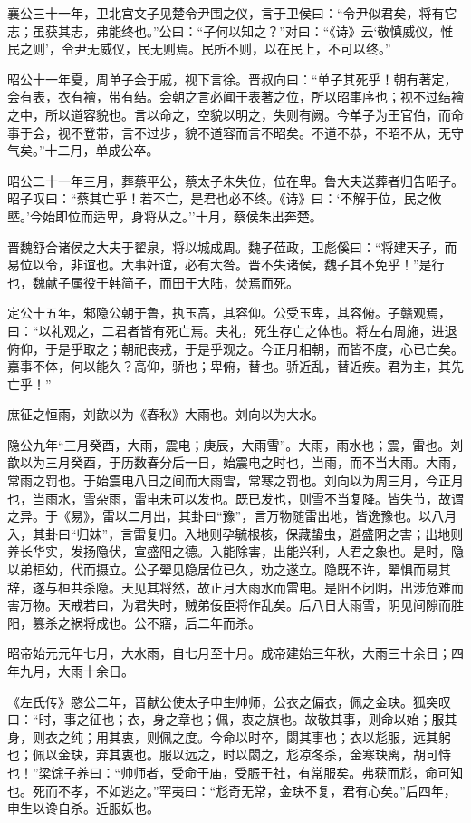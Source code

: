 \documentclass[]{article}
\begin{document}
襄公三十一年，卫北宫文子见楚令尹围之仪，言于卫侯曰：``令尹似君矣，将有它志；虽获其志，弗能终也。''公曰：``子何以知之？''对曰：``《诗》云`敬慎威仪，惟民之则'，令尹无威仪，民无则焉。民所不则，以在民上，不可以终。''

昭公十一年夏，周单子会于戚，视下言徐。晋叔向曰：``单子其死乎！朝有著定，会有表，衣有襘，带有结。会朝之言必闻于表著之位，所以昭事序也；视不过结襘之中，所以道容貌也。言以命之，空貌以明之，失则有阙。今单子为王官伯，而命事于会，视不登带，言不过步，貌不道容而言不昭矣。不道不恭，不昭不从，无守气矣。''十二月，单成公卒。

昭公二十一年三月，葬蔡平公，蔡太子朱失位，位在卑。鲁大夫送葬者归告昭子。昭子叹曰：``蔡其亡乎！若不亡，是君也必不终。《诗》曰：`不解于位，民之攸塈。'今始即位而适卑，身将从之。''十月，蔡侯朱出奔楚。

晋魏舒合诸侯之大夫于翟泉，将以城成周。魏子莅政，卫彪傒曰：``将建天子，而易位以令，非谊也。大事奸谊，必有大咎。晋不失诸侯，魏子其不免乎！''是行也，魏献子属役于韩简子，而田于大陆，焚焉而死。

定公十五年，邾隐公朝于鲁，执玉高，其容仰。公受玉卑，其容俯。子赣观焉，曰：``以礼观之，二君者皆有死亡焉。夫礼，死生存亡之体也。将左右周施，进退俯仰，于是乎取之；朝祀丧戎，于是乎观之。今正月相朝，而皆不度，心已亡矣。嘉事不体，何以能久？高仰，骄也；卑俯，替也。骄近乱，替近疾。君为主，其先亡乎！''

庶征之恒雨，刘歆以为《春秋》大雨也。刘向以为大水。

隐公九年``三月癸酉，大雨，震电；庚辰，大雨雪''。大雨，雨水也；震，雷也。刘歆以为三月癸酉，于历数春分后一日，始震电之时也，当雨，而不当大雨。大雨，常雨之罚也。于始震电八日之间而大雨雪，常寒之罚也。刘向以为周三月，今正月也，当雨水，雪杂雨，雷电未可以发也。既已发也，则雪不当复降。皆失节，故谓之异。于《易》，雷以二月出，其卦曰``豫''，言万物随雷出地，皆逸豫也。以八月入，其卦曰``归妹''，言雷复归。入地则孕毓根核，保藏蛰虫，避盛阴之害；出地则养长华实，发扬隐伏，宣盛阳之德。入能除害，出能兴利，人君之象也。是时，隐以弟桓幼，代而摄立。公子翚见隐居位已久，劝之遂立。隐既不许，翚惧而易其辞，遂与桓共杀隐。天见其将然，故正月大雨水而雷电。是阳不闭阴，出涉危难而害万物。天戒若曰，为君失时，贼弟佞臣将作乱矣。后八日大雨雪，阴见间隙而胜阳，篡杀之祸将成也。公不寤，后二年而杀。

昭帝始元元年七月，大水雨，自七月至十月。成帝建始三年秋，大雨三十余日；四年九月，大雨十余日。

《左氏传》愍公二年，晋献公使太子申生帅师，公衣之偏衣，佩之金玦。狐突叹曰：``时，事之征也；衣，身之章也；佩，衷之旗也。故敬其事，则命以始；服其身，则衣之纯；用其衷，则佩之度。今命以时卒，閟其事也；衣以尨服，远其躬也；佩以金玦，弃其衷也。服以远之，时以閟之，尨凉冬杀，金寒玦离，胡可恃也！''梁馀子养曰：``帅师者，受命于庙，受脤于社，有常服矣。弗获而尨，命可知也。死而不孝，不如逃之。''罕夷曰：``尨奇无常，金玦不复，君有心矣。''后四年，申生以谗自杀。近服妖也。
\end{document}
